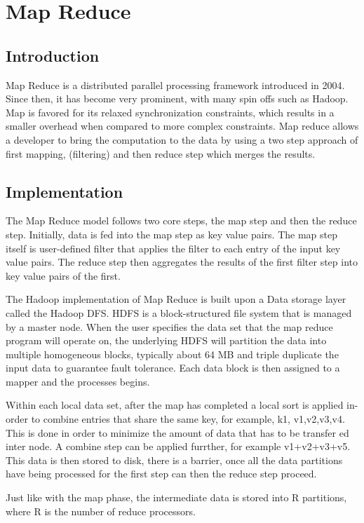 \documentclass[10pt,twocolumn]{IEEEtran11}
\begin{document}
    
\section{Map Reduce}
\subsection{Introduction}
Map Reduce is a distributed parallel processing framework introduced in 2004\cite{dean2001mapreduce}.  Since then, it has become very prominent, with many spin offs such as Hadoop.  Map is favored for its relaxed synchronization constraints, which results in a smaller overhead when compared to more complex constraints.  Map reduce allows a developer to bring the computation to the data by using a two step approach of first mapping, (filtering) and then reduce step which merges the results.
\subsection{Implementation}
The Map Reduce model follows two core steps, the map step and then the reduce step.  Initially, data is fed into the map step as key value pairs.  The map step itself is user-defined filter that applies the filter to each entry of the input key value pairs.  The reduce step then aggregates the results of the first filter step into key value pairs of the first.
\par
The Hadoop implementation of Map Reduce is built upon a Data storage layer called the Hadoop DFS.  HDFS is a block-structured file system that is managed by a master node.  When the user specifies the data set that the map reduce program will operate on, the underlying HDFS will partition the data into multiple homogeneous blocks, typically about 64 MB and triple duplicate the input data to guarantee fault tolerance.  Each data block is then assigned to a mapper and the processes begins.
\par
Within each local data set, after the map has completed a local sort is applied in-order to combine entries that share the same key, for example, {k1, v1,v2,v3,v4}.  This is done in order to minimize the amount of data that has to be transfer ed inter node. A combine step can be applied furrther, for example v1+v2+v3+v5.  This data is then stored to disk, there is a barrier, once all the data partitions have being processed for the first step can then the reduce step proceed.  
\par
Just like with the map phase, the intermediate data is stored into R partitions, where R is the number of reduce processors.
\end{document}
